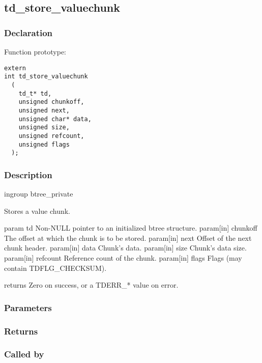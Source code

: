 
\newpage
\subsection{td\_store\_valuechunk}
\subsubsection{Declaration} Function prototype:

\begin{verbatim}
extern
int td_store_valuechunk
  (
    td_t* td,
    unsigned chunkoff,
    unsigned next,
    unsigned char* data,
    unsigned size,
    unsigned refcount,
    unsigned flags
  );
\end{verbatim}

\subsubsection{Description}


 ingroup btree\_private

 Stores a value chunk.

 param td Non-NULL pointer to an initialized btree structure.
 param[in] chunkoff  The offset at which the chunk is to be stored.
 param[in] next      Offset of the next chunk header.
 param[in] data      Chunk's data.
 param[in] size      Chunk's data size.
 param[in] refcount  Reference count of the chunk.
 param[in] flags     Flags (may contain TDFLG\_CHECKSUM).

 returns Zero on success, or a TDERR\_* value on error.
 

\subsubsection{Parameters}
\subsubsection{Returns}
\subsubsection{Called by}

